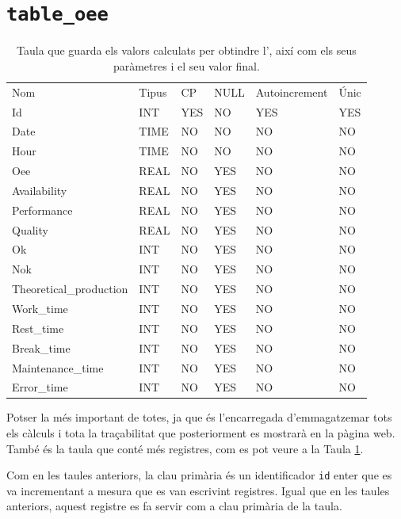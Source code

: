 \documentclass{tfgitic}[2022/06/30]
\begin{document}
\section{\texttt{table\_oee}}

\begin{table}[h]
\centering
\label{table:tableOee}
\begin{tabular}{
>{\columncolor[HTML]{EBEAEA}}llllll}
\cellcolor[HTML]{D3D3D3} Nom & \cellcolor[HTML]{D3D3D3} Tipus & \cellcolor[HTML]{D3D3D3} CP&  \cellcolor[HTML]{D3D3D3} NULL & \cellcolor[HTML]{D3D3D3} Autoincrement & \cellcolor[HTML]{D3D3D3} Únic\\
Id & INT & YES & NO & YES & YES  \\
Date & TIME & NO & NO & NO & NO \\
Hour & TIME & NO & NO & NO & NO \\
Oee & REAL & NO & YES & NO & NO \\
Availability & REAL & NO & YES & NO & NO \\
Performance & REAL & NO & YES & NO & NO \\
Quality & REAL & NO & YES & NO & NO \\
Ok & INT & NO & YES & NO & NO \\
Nok & INT & NO & YES & NO & NO \\
Theoretical\_production & INT & NO & YES & NO & NO \\
Work\_time & INT & NO & YES & NO & NO \\
Rest\_time & INT & NO & YES & NO & NO \\
Break\_time & INT & NO & YES & NO & NO \\
Maintenance\_time & INT & NO & YES & NO & NO \\
Error\_time & INT & NO & YES & NO & NO \\
\end{tabular}
\caption{Taula que guarda els valors calculats per obtindre l', així com els seus paràmetres i el seu valor final.}
\end{table}

Potser la més important de totes, ja que és l'encarregada d'emmagatzemar tots els càlculs i tota la traçabilitat que posteriorment es mostrarà en la pàgina web. També és la taula que conté més registres, com es pot veure a la Taula \ref{table:tableOee}.

Com en les taules anteriors, la clau primària és un identificador \texttt{id} enter que es va incrementant a mesura que es van escrivint registres. Igual que en les taules anteriors, aquest registre es fa servir com a clau primària de la taula.
\end{document}
